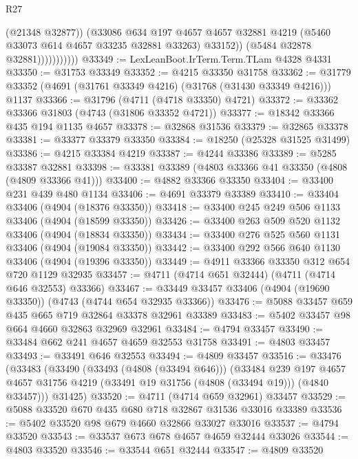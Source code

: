 \begin{lexlean}{R27}
\begin{coremodule}
                            (@21348 @32877))
                          (@33086
                            @634
                            @197
                            @4657
                            @4657
                            @32881
                            @4219
                            (@5460 @33073 @614 @4657 @33235 @32881 @33263)
                            @33152))
                        (@5484 @32878 @32881)))))))))))
@33349 := LexLeanBoot.IrTerm.Term.TLam @4328 @4331
@33350 := @31753 @33349
@33352 := @4215 @33350 @31758
@33362 := @31779 @33352 (@4691 (@31761 @33349 @4216) (@31768 (@31430 @33349 @4216))) @1137
@33366 := @31796 (@4711 (@4718 @33350) @4721)
@33372 := @33362 @33366 @31803 (@4743 (@31806 @33352 @4721))
@33377 := @18342 @33366 @435 @194 @1135 @4657
@33378 := @32868 @31536
@33379 := @32865 @33378
@33381 := @33377 @33379 @33350
@33384 := @18250 (@25328 @31525 @31499)
@33386 := @4215 @33384 @4219
@33387 := @4244 @33386
@33389 := @5285 @33387 @32881
@33398 := @33381 @33389 (@4803 @33366 @41 @33350 (@4808 (@4809 @33366 @41)))
@33400 := @4882 @33366 @33350
@33404 := @33400 @231 @439 @480 @1134
@33406 := @4691 @33379 @33389
@33410 := @33404 @33406 (@4904 (@18376 @33350))
@33418 := @33400 @245 @249 @506 @1133 @33406 (@4904 (@18599 @33350))
@33426 := @33400 @263 @509 @520 @1132 @33406 (@4904 (@18834 @33350))
@33434 := @33400 @276 @525 @560 @1131 @33406 (@4904 (@19084 @33350))
@33442 := @33400 @292 @566 @640 @1130 @33406 (@4904 (@19396 @33350))
@33449 := @4911 @33366 @33350 @312 @654 @720 @1129 @32935
@33457 := @4711 (@4714 @651 @32444) (@4711 (@4714 @646 @32553) @33366)
@33467 := @33449 @33457 @33406 (@4904 (@19690 @33350)) (@4743 (@4744 @654 @32935 @33366))
@33476 := @5088 @33457 @659 @435 @665 @719 @32864 @33378 @32961 @33389
@33483 := @5402 @33457 @98 @664 @4660 @32863 @32969 @32961
@33484 := @4794 @33457
@33490 := @33484 @662 @241 @4657 @4659 @32553 @31758
@33491 := @4803 @33457
@33493 := @33491 @646 @32553
@33494 := @4809 @33457
@33516 := @33476
    (@33483
      (@33490
        (@33493 (@4808 (@33494 @646)))
        (@33484
          @239
          @197
          @4657
          @4657
          @31756
          @4219
          (@33491 @19 @31756 (@4808 (@33494 @19)))
          (@4840 @33457)))
      @31425)
@33520 := @4711 (@4714 @659 @32961) @33457
@33529 := @5088 @33520 @670 @435 @680 @718 @32867 @31536 @33016 @33389
@33536 := @5402 @33520 @98 @679 @4660 @32866 @33027 @33016
@33537 := @4794 @33520
@33543 := @33537 @673 @678 @4657 @4659 @32444 @33026
@33544 := @4803 @33520
@33546 := @33544 @651 @32444
@33547 := @4809 @33520

\end{coremodule}
\end{lexlean}
